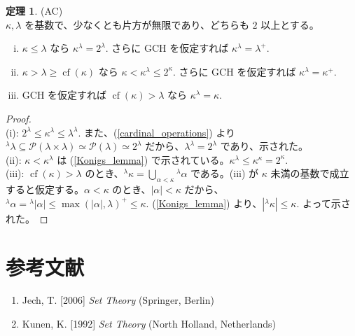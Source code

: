 \documentclass{jsarticle}
\theoremstyle{definition}
\newtheorem{theorem}{定理}[section]
\begin{document}
    \begin{theorem} \label{cardinal_power} (AC)\\
        $\kappa, \lambda$ を基数で、少なくとも片方が無限であり、どちらも $2$ 以上とする。
        \begin{enumerate}[(i)]
            \item $\kappa \leq \lambda$ なら $\kappa^\lambda = 2^\lambda.$ さらに GCH を仮定すれば $\kappa^\lambda = \lambda^+.$
            \item $\kappa > \lambda \geq \operatorname{cf}(\kappa)$ なら $\kappa < \kappa^\lambda \leq 2^\kappa.$ さらに GCH を仮定すれば $\kappa^\lambda = \kappa^+.$
            \item GCH を仮定すれば $\operatorname{cf}(\kappa) > \lambda$ なら $\kappa^\lambda = \kappa.$
        \end{enumerate}
    \end{theorem}
    \begin{proof} \ \\
        (i): $2^\lambda \leq \kappa^\lambda \leq \lambda^\lambda.$ また、(\ref{cardinal_operations}) より $^\lambda\lambda \subseteq \mathcal{P}(\lambda \times \lambda) \simeq \mathcal{P}(\lambda) \simeq 2^\lambda$ だから、$\lambda^\lambda = 2^\lambda$ であり、示された。\\
        (ii): $\kappa < \kappa^\lambda$ は (\ref{Konigs_lemma}) で示されている。$\kappa^\lambda \leq \kappa^\kappa = 2^\kappa.$\\
        (iii): $\operatorname{cf}(\kappa) > \lambda$ のとき、$\displaystyle ^\lambda \kappa = \bigcup_{\alpha < \kappa} {^\lambda \alpha}$ である。(iii) が $\kappa$ 未満の基数で成立すると仮定する。$\alpha < \kappa$ のとき、$|\alpha| < \kappa$ だから、$^\lambda\alpha = {^\lambda|\alpha|} \leq \max(|\alpha|, \lambda)^+ \leq \kappa.$ (\ref{Konigs_lemma}) より、$|{^\lambda \kappa}| \leq \kappa.$ よって示された。
    \end{proof}
    
    \section{参考文献}
    \begin{enumerate}[]
        \item Jech, T. [2006] {\it Set Theory} (Springer, Berlin)
        \item Kunen, K. [1992] {\it Set Theory} (North Holland, Netherlands)
    \end{enumerate}
\end{document}
